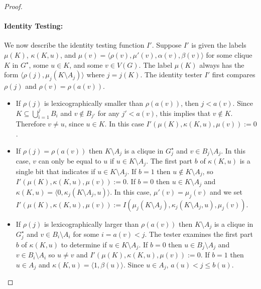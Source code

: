 \documentclass{patmorin}
\renewcommand{\le}{\leqslant}
\begin{document}
\begin{proof}
     \paragraph{Identity Testing:}
     We now describe the identity testing function $I'$.
     Suppose $I'$ is given the labels $\mu(K)$, $\kappa(K,u)$, and $\mu(v)=\langle \rho(v),\mu'(v),\alpha(v),\beta(v)\rangle$ for some clique $K$ in $G^\star$, some $u\in K$, and some $v\in V(G)$. The label $\mu(K)$ always has the form $\langle\rho(j),\mu_j(K\setminus A_j)\rangle$ where $j=j(K)$.
     The identity tester $I'$ first compares $\rho(j)$ and $\rho(v)=\rho(a(v))$.
     \begin{itemize}
       \item If $\rho(j)$ is lexicographically smaller than $\rho(a(v))$, then $j<a(v)$.  Since $K\subseteq\bigcup_{i=1}^j B_i$ and $v\not\in B_{j'}$ for any $j'<a(v)$, this implies that $v\not\in K$.  Therefore $v\neq u$, since $u\in K$. In this case $I'(\mu(K),\kappa(K,u),\mu(v)):=0$.

       \item If $\rho(j)=\rho(a(v))$ then $K\setminus A_j$ is a clique in $G^\star_j$ and $v\in B_j\setminus A_j$.
       In this case, $v$ can only be equal to $u$ if $u\in K\setminus A_j$.
       The first part $b$ of $\kappa(K,u)$ is a single bit that indicates if $u\in K\setminus A_j$.  If $b=1$ then $u\not\in K\setminus A_j$, so $I'(\mu(K),\kappa(K,u),\mu(v)):=0$.  If $b=0$ then $u\in K\setminus A_j$ and $\kappa(K,u)=\langle 0,\kappa_j(K\setminus A_j,u)\rangle$.
       In this case, $\mu'(v)=\mu_j(v)$ and we set
       $I'(\mu(K),\kappa(K,u),\mu(v)):=I(\mu_j(K\setminus A_j),\kappa_j(K\setminus A_j,u),\mu_j(v))$.

       \item If $\rho(j)$ is lexicographically larger than $\rho(a(v))$ then $K\setminus A_j$ is a clique in $G^\star_j$ and $v\in B_i\setminus A_i$ for some $i=a(v) < j$.  The tester examines the first part $b$ of $\kappa(K,u)$ to determine if $u\in K\setminus A_j$.  If $b=0$ then  $u\in B_j\setminus A_j$ and $v\in B_i\setminus A_i$ so $u\neq v$ and $I'(\mu(K),\kappa(K,u),\mu(v)):=0$.  If $b=1$ then $u\in A_j$ and $\kappa(K,u)=\langle 1,\beta(u)\rangle$. Since $u\in A_j$, $a(u) < j\le b(u)$.


\end{itemize}
\end{proof}
\end{document}
